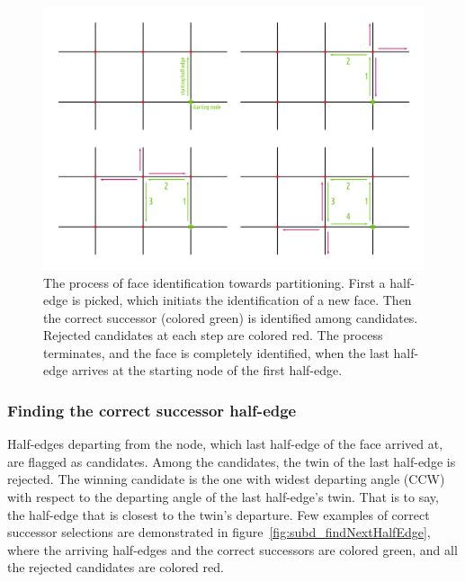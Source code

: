 \begin{figure} %
    \centering
    \includegraphics[width=1.\textwidth]{figures/subd_pathFollower.png}
    \caption{The process of face identification towards partitioning.
      First a half-edge is picked, which initiats the identification of a new face.
      Then the correct successor (colored green) is identified among candidates.
      Rejected candidates at each step are colored red.
      The process terminates, and the face is completely identified, when the last half-edge arrives at the starting node of the first half-edge.}
    \label{fig:subd_pathFollower}
\end{figure}

\subsubsection{Finding the correct successor half-edge}

Half-edges departing from the node, which last half-edge of the face arrived at, are flagged as candidates.
Among the candidates, the twin of the last half-edge is rejected.
The winning candidate is the one with widest departing angle (CCW) with respect to the departing angle of the last half-edge's twin.
That is to say, the half-edge that is closest to the twin's departure.
Few examples of correct successor selections are demonstrated in figure~\ref{fig:subd_findNextHalfEdge}, where the arriving half-edges and the correct successors are colored green, and all the rejected candidates are colored red.

